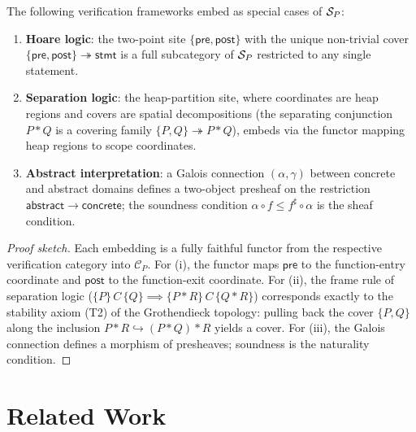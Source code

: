 \documentclass[11pt]{article}
\begin{document}
\begin{theorem}\label{thm:embedding}
The following verification frameworks embed as special cases of
$\mathcal{S}_P$:
\begin{enumerate}[label=(\roman*),nosep]
  \item \textbf{Hoare logic}: the two-point site
        $\{\mathsf{pre}, \mathsf{post}\}$ with the unique non-trivial
        cover $\{\mathsf{pre}, \mathsf{post}\} \twoheadrightarrow
        \mathsf{stmt}$ is a full subcategory of $\mathcal{S}_P$ restricted
        to any single statement.
  \item \textbf{Separation logic}: the heap-partition site, where
        coordinates are heap regions and covers are spatial
        decompositions (the separating conjunction
        $P * Q$ is a covering family $\{P, Q\} \twoheadrightarrow
        P * Q$), embeds via the functor mapping heap regions to
        scope coordinates.
  \item \textbf{Abstract interpretation}: a Galois connection
        $(\alpha, \gamma)$ between concrete and abstract domains
        defines a two-object presheaf on the restriction
        $\mathsf{abstract} \to \mathsf{concrete}$; the soundness
        condition $\alpha \circ f \leq f^\sharp \circ \alpha$ is the
        sheaf condition.
\end{enumerate}
\end{theorem}

\begin{proof}[Proof sketch]
Each embedding is a fully faithful functor from the respective
verification category into $\mathcal{C}_P$.  For (i), the functor
maps $\mathsf{pre}$ to the function-entry coordinate and
$\mathsf{post}$ to the function-exit coordinate.  For (ii), the
frame rule of separation logic
($\{P\}\, C\, \{Q\} \implies \{P * R\}\, C\, \{Q * R\}$)
corresponds exactly to the stability axiom (T2) of the Grothendieck
topology: pulling back the cover $\{P, Q\}$ along the inclusion
$P * R \hookrightarrow (P * Q) * R$ yields a cover.
For (iii), the Galois connection defines a morphism of presheaves;
soundness is the naturality condition.
\end{proof}

\section{Related Work}\label{sec:related}
\end{document}
